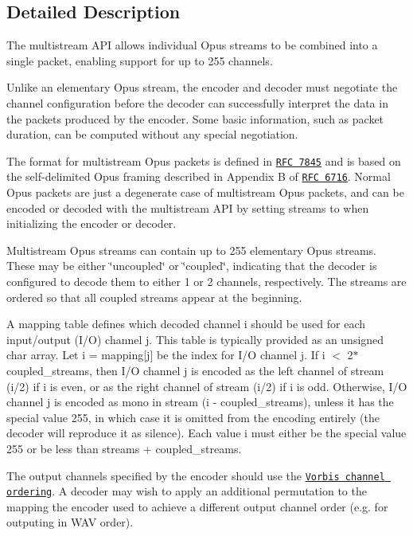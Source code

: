 \subsection{Detailed Description}
The multistream A\+PI allows individual Opus streams to be combined into a single packet, enabling support for up to 255 channels. 

Unlike an elementary Opus stream, the encoder and decoder must negotiate the channel configuration before the decoder can successfully interpret the data in the packets produced by the encoder. Some basic information, such as packet duration, can be computed without any special negotiation.

The format for multistream Opus packets is defined in \href{https://tools.ietf.org/html/rfc7845}{\tt R\+FC 7845} and is based on the self-\/delimited Opus framing described in Appendix B of \href{https://tools.ietf.org/html/rfc6716}{\tt R\+FC 6716}. Normal Opus packets are just a degenerate case of multistream Opus packets, and can be encoded or decoded with the multistream A\+PI by setting {\ttfamily streams} to {} when initializing the encoder or decoder.

Multistream Opus streams can contain up to 255 elementary Opus streams. These may be either \char`\"{}uncoupled\char`\"{} or \char`\"{}coupled\char`\"{}, indicating that the decoder is configured to decode them to either 1 or 2 channels, respectively. The streams are ordered so that all coupled streams appear at the beginning.

A {\ttfamily mapping} table defines which decoded channel {\ttfamily i} should be used for each input/output (I/O) channel {\ttfamily j}. This table is typically provided as an unsigned char array. Let {\ttfamily i = mapping\mbox{[}j\mbox{]}} be the index for I/O channel {\ttfamily j}. If {\ttfamily i $<$ 2$\ast$coupled\+\_\+streams}, then I/O channel {\ttfamily j} is encoded as the left channel of stream {\ttfamily (i/2)} if {\ttfamily i} is even, or as the right channel of stream {\ttfamily (i/2)} if {\ttfamily i} is odd. Otherwise, I/O channel {\ttfamily j} is encoded as mono in stream {\ttfamily (i -\/ coupled\+\_\+streams)}, unless it has the special value 255, in which case it is omitted from the encoding entirely (the decoder will reproduce it as silence). Each value {\ttfamily i} must either be the special value 255 or be less than {\ttfamily streams + coupled\+\_\+streams}.

The output channels specified by the encoder should use the \href{https://www.xiph.org/vorbis/doc/Vorbis_I_spec.html#x1-810004.3.9}{\tt Vorbis channel ordering}. A decoder may wish to apply an additional permutation to the mapping the encoder used to achieve a different output channel order (e.\+g. for outputing in W\+AV order).

